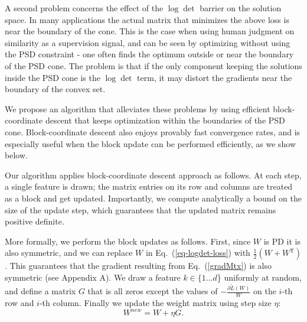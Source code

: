 \documentclass{article} %
\newcommand\mat[1]{{#1}}
\newcommand{\T}{{}^\mathsf{T}}
\newcommand{\W}{\mat{W}}
\newcommand{\newW}{{\mat{W^{new}}}}
\newcommand{\tL}{\tilde{L}(\W)}
\newcommand{\grd}{\frac{\partial \tL}{\W}}
\renewcommand{\eqref}[1]{Eq.~(\ref{#1})}
\begin{document}
A second problem concerns the effect of the $\log \det$ barrier on the solution space. In many applications the actual matrix that minimizes the above loss is near the boundary of the cone. This is the case when using human judgment on similarity as a supervision signal, and can be seen by optimizing without using the PSD constraint - one often finds the optimum outside or near the boundary of the PSD cone.
The problem is that if the only component keeping the solutions inside the PSD cone is the $\log \det$ term, it may distort the gradients near the boundary of the convex set. 

We propose an algorithm that alleviates these problems by using efficient block-coordinate descent that keeps optimization within the boundaries of the PSD cone.
Block-coordinate descent also enjoys provably fast convergence rates, and is especially useful when the block update can be performed efficiently, as we show below.

Our algorithm applies block-coordinate descent approach as follows.
At each step, a single feature is drawn; the matrix entries on its row and columns are treated as a block and get updated. Importantly, we compute analytically a bound on the size of the update step, which guarantees that the updated matrix remains positive definite.

More formally, we perform the block updates as follows. First, since $\W$ is PD it is also symmetric, and we can replace $\W$ in \eqref{eq-logdet-loss} with $\tfrac{1}{2}(\W + \W\T)$. This guarantees that the gradient resulting from \eqref{gradMtx} is also symmetric (see Appendix A). We draw a feature $k \in \{1 \ldots d$\} uniformly at random, and define a matrix $G$ that is all zeros except the values of $-\grd$ on the $i$-th row and $i$-th column. Finally we update the weight matrix using step size $\eta$:
\begin{equation}
    \newW = \W +\eta G.
\label{updateEq}
\end{equation}

\end{document}
